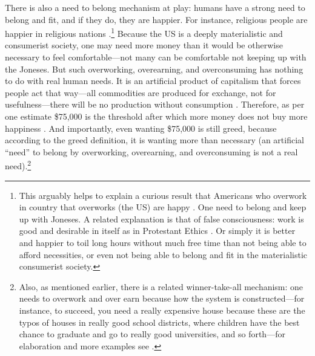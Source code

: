 \documentclass[10pt, letterpaper]{article}
\begin{document}
\begin{spacing}{1.8}
There is also a need to belong mechanism at play: humans have a strong need to
belong and fit, and if they do, they are happier. For instance, religious people are happier in religious nations
\citep{aokrel}.\footnote{This arguably helps to explain a curious result that
  Americans who overwork in country that overworks (the US) are happy
  \citep{aokditella}. One need to belong and keep up with Joneses. A related
  explanation is that of false consciousness: work is good and desirable in
  itself as in Protestant Ethics \citep{weber03}. Or simply it is better and
  happier to toil long hours without much free time than not being able to
  afford necessities, or even not being able to belong and fit in the
  materialistic consumerist society.}
Because the US is a deeply materialistic and consumerist society, one may need more money than it would be otherwise necessary to feel comfortable---not
many can be comfortable not keeping up with the Joneses. But such overworking, overearning, and overconsuming has nothing to do with real human needs. It is an artificial
product of capitalism that forces people act that way---all commodities are
produced for exchange, not for usefulness---there will be no production without
consumption \citep{marx1844-human-requirements}. Therefore, as per one estimate
\$75,000 is the threshold after which more money does not buy more happiness
\citep{kahneman10}. And importantly, even wanting \$75,000 is still greed,
because according to the greed definition, it is wanting more than necessary (an
artificial ``need'' to belong by overworking, overearning, and overconsuming is not a real need).\footnote{Also, as mentioned earlier, there is a related winner-take-all
  mechanism: one needs to overwork and over earn because how the system is constructed---for instance, to succeed, you need a really expensive house
  because these are the typos of houses in really good school districts, where children have the best chance to graduate and go to really good universities, and
  so forth---for elaboration and more examples see \citet{frank12}.}


\end{spacing}
\end{document}
